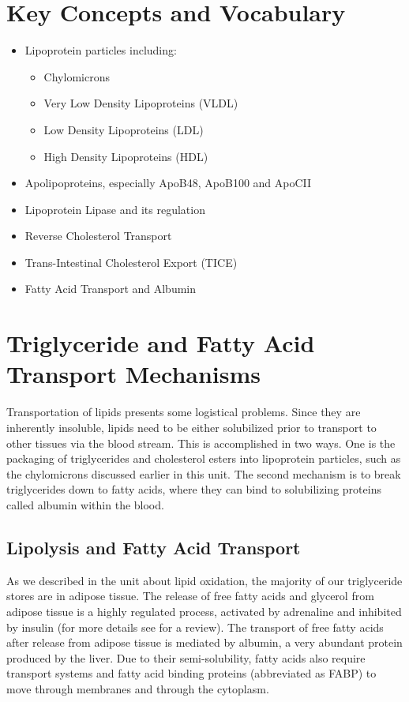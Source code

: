 \documentclass{tufte-handout}
\begin{document}
\section{Key Concepts and Vocabulary}

\begin{itemize}
	\item Lipoprotein particles including:
	\begin{itemize}
		\item Chylomicrons
		\item Very Low Density Lipoproteins (VLDL)
		\item Low Density Lipoproteins (LDL)
		\item High Density Lipoproteins (HDL)
	\end{itemize}
	\item Apolipoproteins, especially ApoB48, ApoB100 and ApoCII
	\item Lipoprotein Lipase and its regulation
	\item Reverse Cholesterol Transport
	\item Trans-Intestinal Cholesterol Export (TICE)
	\item Fatty Acid Transport and Albumin
\end{itemize}

\section{Triglyceride and Fatty Acid Transport Mechanisms}

Transportation of lipids presents some logistical problems.  Since they are inherently insoluble, lipids need to be either solubilized prior to transport to other tissues via the blood stream.  This is accomplished in two ways.  One is the packaging of triglycerides and cholesterol esters into lipoprotein particles, such as the chylomicrons discussed earlier in this unit.  The second mechanism is to break triglycerides down to fatty acids, where they can bind to solubilizing proteins called albumin within the blood.

\subsection{Lipolysis and Fatty Acid Transport}

As we described in the unit about lipid oxidation, the majority of our triglyceride stores are in adipose tissue.  The release of free fatty acids and glycerol from adipose tissue is a highly regulated process, activated by adrenaline and inhibited by insulin (for more details see \citet{Zechner2012} for a review).  The transport of free fatty acids after release from adipose tissue is mediated by albumin, a very abundant protein produced by the liver.  Due to their semi-solubility, fatty acids also require transport systems and fatty acid binding proteins (abbreviated as FABP) to move through membranes and through the cytoplasm.
\end{document}

